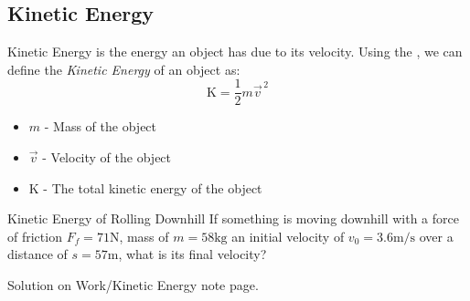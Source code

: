 \subsection{Kinetic Energy}\label{subsec:Kinetic Energy}
\begin{definition}\label{def:Kinetic Energy}
  Kinetic Energy is the energy an object has due to its velocity.
  Using the , we can define the \emph{Kinetic Energy} of an object as:
  \begin{equation}\label{eq:Kinetic Energy}
    \text{K} = \frac{1}{2} m \vec{v}^{\,2}
  \end{equation}
  \begin{itemize}[noitemsep, nolistsep]
    \item $m$ - Mass of the object
    \item $\vec{v}$ - Velocity of the object
    \item $\text{K}$ - The total kinetic energy of the object
  \end{itemize}
\end{definition}

\begin{example}[]{Kinetic Energy of Rolling Downhill}
  If something is moving downhill with a force of friction $F_{f} = 71 \si{\newton}$, mass of $m=58 \si{\kilo \gram}$ an initial velocity of $v_{0} = 3.6 \si{\meter / \second}$ over a distance of $s=57 \si{\meter}$, what is its final velocity?

  \tcblower

  Solution on Work/Kinetic Energy note page.
\end{example}


